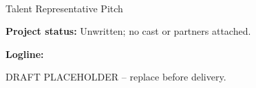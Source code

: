 \documentclass[11pt,letterpaper]{article}
\begin{document}
\begin{center}
{\Large\bfseries\sffamily \filmtitleupper}\\[6pt]
Talent Representative Pitch
\end{center}
\textbf{Project status:} Unwritten; no cast or partners attached.

\textbf{Logline:} \filmlogline

DRAFT PLACEHOLDER -- replace before delivery.
\end{document}
